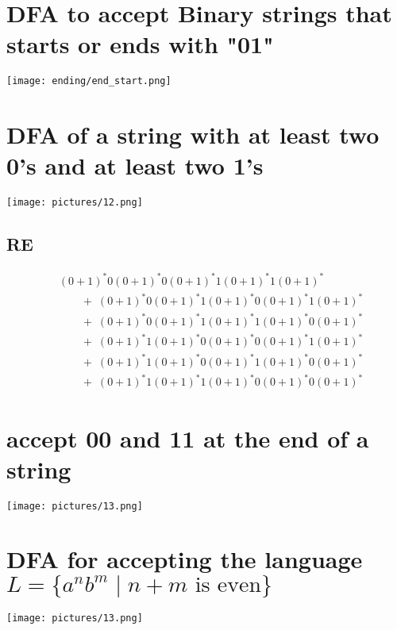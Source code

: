 \documentclass[8pt]{article}
\begin{document}
\section{DFA to accept Binary strings that starts or ends with "01"}
\begin{center}
    \texttt{[image: ending/end\_start.png]} %
\end{center}
\section{DFA of a string with at least two 0’s and at least two 1’s}
\begin{center}
    \texttt{[image: pictures/12.png]} %
\end{center}
\subsection{RE}
\[
\begin{aligned}
&(0+1)^{*}0(0+1)^{*}0(0+1)^{*}1(0+1)^{*}1(0+1)^{*} \\
&\qquad+\; (0+1)^{*}0(0+1)^{*}1(0+1)^{*}0(0+1)^{*}1(0+1)^{*} \\
&\qquad+\; (0+1)^{*}0(0+1)^{*}1(0+1)^{*}1(0+1)^{*}0(0+1)^{*} \\
&\qquad+\; (0+1)^{*}1(0+1)^{*}0(0+1)^{*}0(0+1)^{*}1(0+1)^{*} \\
&\qquad+\; (0+1)^{*}1(0+1)^{*}0(0+1)^{*}1(0+1)^{*}0(0+1)^{*} \\
&\qquad+\; (0+1)^{*}1(0+1)^{*}1(0+1)^{*}0(0+1)^{*}0(0+1)^{*}
\end{aligned}
\]


\section{ accept 00 and 11 at the end of a string}
\begin{center}
    \texttt{[image: pictures/13.png]} %
\end{center}
\section{DFA for accepting the language $L = \{ a^n b^m \mid n+m \text{ is even} \}$}
\begin{center}
    \texttt{[image: pictures/13.png]} %
\end{center}
\end{document}
